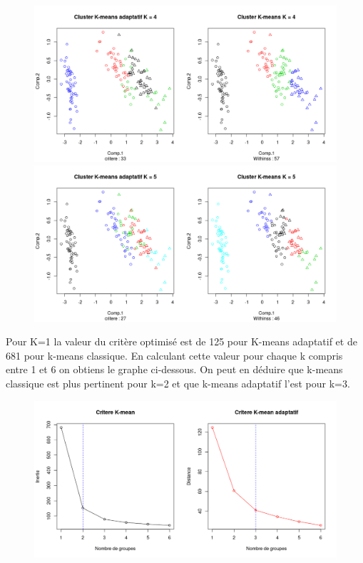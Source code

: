 \documentclass[a4paper, titlepage]{report}
\begin{document}
\begin{figure}[h]
	\begin{center}
		\includegraphics[scale = 0.21]{./doc/iris-ks-4.png}
		\includegraphics[scale = 0.21]{./doc/iris-ks-5.png}
	\end{center}
\end{figure}

Pour K=1 la valeur du critère optimisé est de 125 pour K-means adaptatif et de 681 pour k-means classique.
En calculant cette valeur pour chaque k compris entre 1 et 6 on obtiens le graphe ci-dessous. On peut en déduire que k-means classique est plus pertinent pour k=2 et que k-means adaptatif l'est pour k=3.

\begin{figure}[h]
	\begin{center}
		\includegraphics[scale = 0.42]{./doc/kmvkma-iris.png}
	\end{center}
\end{figure}
\end{document}
